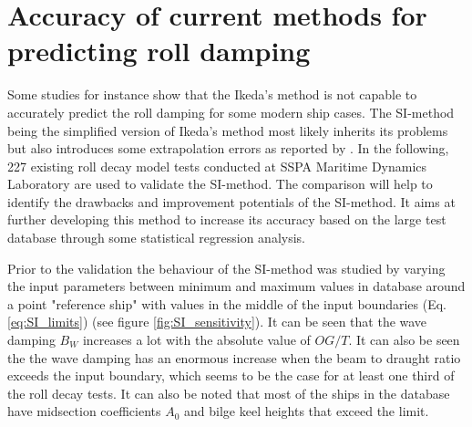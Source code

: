 \section{Accuracy of current methods for predicting roll damping}
\label{se:accuracy_SI_method}
Some studies for instance \parencite{soder_assessment_2019} show that the Ikeda's method is not capable to accurately predict the roll damping for some modern ship cases. The SI-method being the simplified version of Ikeda's method most likely inherits its problems but also introduces some extrapolation errors as reported by \parencite{rudakovic_application_2017}. In the following, 227 existing roll decay model tests conducted at SSPA Maritime Dynamics Laboratory are used to validate the SI-method. The comparison will help to identify the drawbacks and improvement potentials of the SI-method. It aims at further developing this method to increase its accuracy based on the large test database through some statistical regression analysis.

Prior to the validation the behaviour of the SI-method was studied by varying the input parameters between minimum and maximum values in database around a point "reference ship" with values in the middle of the input boundaries (Eq. \ref{eq:SI_limits}) (see figure \ref{fig:SI_sensitivity}). It can be seen that the wave damping $B_W$ increases a lot with the absolute value of $OG/T$. It can also be seen the the wave damping has an enormous increase when the beam to draught ratio exceeds the input boundary, which seems to be the case for at least one third of the roll decay tests. It can also be noted that most of the ships in the database have midsection coefficients $A_0$ and bilge keel heights that exceed the limit. 

